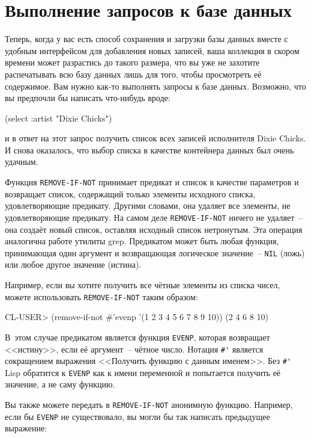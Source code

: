 \section{Выполнение запросов к базе данных}

Теперь, когда у вас есть способ сохранения и загрузки базы данных вместе с удобным
интерфейсом для добавления новых записей, ваша коллекция в скором времени может разрастись
до такого размера, что вы уже не захотите распечатывать всю базу данных лишь для того,
чтобы просмотреть её содержимое. Вам нужно как-то выполнять запросы к базе
данных. Возможно, что вы предпочли бы написать что-нибудь вроде:

\begin{myverb}
(select :artist "Dixie Chicks")
\end{myverb}

\noindent{}и в ответ на этот запрос получить список всех записей исполнителя Dixie Chicks. И снова
оказалось, что выбор списка в качестве контейнера данных был очень удачным.

Функция \lstinline{REMOVE-IF-NOT} принимает предикат и список в качестве параметров и
возвращает список, содержащий только элементы исходного списка, удовлетворяющие
предикату. Другими словами, она удаляет все элементы, не удовлетворяющие предикату. На
самом деле \lstinline{REMOVE-IF-NOT} ничего не удаляет~-- она создаёт новый список, оставляя
исходный список нетронутым. Эта операция аналогична работе утилиты grep. Предикатом может
быть любая функция, принимающая один аргумент и возвращающая логическое значение~--
\lstinline{NIL} (ложь) или любое другое значение (истина).

Например, если вы хотите получить все чётные элементы из списка чисел, можете использовать
\lstinline{REMOVE-IF-NOT} таким образом:

\begin{myverb}
CL-USER> (remove-if-not #'evenp '(1 2 3 4 5 6 7 8 9 10))
(2 4 6 8 10)
\end{myverb}

В~этом случае предикатом является функция \lstinline{EVENP}, которая возвращает <<истину>>,
если её аргумент~-- чётное число. Нотация \lstinline!#'! является сокращением выражения
<<Получить функцию с данным именем>>. Без \lstinline!#'! Lisp обратится к \lstinline{EVENP} как к
имени переменной и попытается получить её значение, а не саму функцию.

Вы также можете передать в \lstinline{REMOVE-IF-NOT} анонимную функцию. Например, если бы
\lstinline{EVENP} не существовало, вы могли бы так написать предыдущее выражение:

